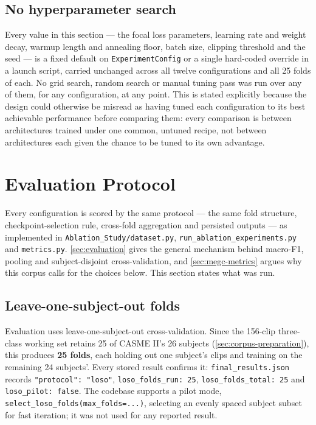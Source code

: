\subsection{No hyperparameter search}
\label{sec:no-hyperparameter-search}

Every value in this section --- the focal loss parameters, learning rate and weight decay, warmup length and annealing floor, batch size, clipping threshold and the seed --- is a fixed default on \texttt{ExperimentConfig} or a single hard-coded override in a launch script, carried unchanged across all twelve configurations and all 25 folds of each. No grid search, random search or manual tuning pass was run over any of them, for any configuration, at any point. This is stated explicitly because the design could otherwise be misread as having tuned each configuration to its best achievable performance before comparing them: every comparison is between architectures trained under one common, untuned recipe, not between architectures each given the chance to be tuned to its own advantage.


\section{Evaluation Protocol}
\label{sec:evaluation-protocol}

Every configuration is scored by the same protocol --- the same fold structure, checkpoint-selection rule, cross-fold aggregation and persisted outputs --- as implemented in \texttt{Ablation\_Study/dataset.py}, \texttt{run\_ablation\_experiments.py} and \texttt{metrics.py}. \autoref{sec:evaluation} gives the general mechanism behind macro-F1, pooling and subject-disjoint cross-validation, and \autoref{sec:megc-metrics} argues why this corpus calls for the choices below. This section states what was run.

\subsection{Leave-one-subject-out folds}
\label{sec:loso-folds}

Evaluation uses leave-one-subject-out cross-validation. Since the 156-clip three-class working set retains 25 of CASME II's 26 subjects (\autoref{sec:corpus-preparation}), this produces \textbf{25 folds}, each holding out one subject's clips and training on the remaining 24 subjects'. Every stored result confirms it: \texttt{final\_results.json} records \texttt{"protocol": "loso"}, \texttt{loso\_folds\_run: 25}, \texttt{loso\_folds\_total: 25} and \texttt{loso\_pilot: false}. The codebase supports a pilot mode, \verb|select_loso_folds(max_folds=...)|, selecting an evenly spaced subject subset for fast iteration; it was not used for any reported result.

